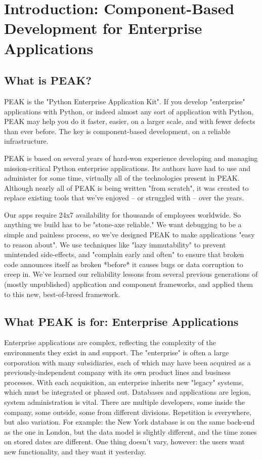 \chapter{Introduction: Component-Based Development for Enterprise Applications}

\section{What is PEAK?}

PEAK is the "Python Enterprise Application Kit". If you develop
"enterprise" applications with Python, or indeed almost any sort of
application with Python, PEAK may help you do it faster, easier, on a
larger scale, and with fewer defects than ever before. The key is
component-based development, on a reliable infrastructure. 

PEAK is based on several years of hard-won experience developing and
managing mission-critical Python enterprise applications. Its authors
have had to use and administer for some time, virtually all of the
technologies present in PEAK. Although nearly all of PEAK is being
written "from scratch", it was created to replace existing tools that
we've enjoyed -- or struggled with -- over the years. 

Our apps require 24x7 availability for thousands of employees worldwide.
So anything we build has to be "stone-axe reliable." We want debugging
to be a simple and painless process, so we've designed PEAK to make
applications "easy to reason about". We use techniques like "lazy
immutability" to prevent unintended side-effects, and "complain early
and often" to ensure that broken code announces itself as broken
*before* it causes bugs or data corruption to creep in. We've learned
our reliability lessons from several previous generations of (mostly
unpublished) application and component frameworks, and applied them to
this new, best-of-breed framework. 


\section{What PEAK is for: Enterprise Applications} 

Enterprise applications are complex, reflecting the complexity of the
environments they exist in and support. The "enterprise" is often a
large corporation with many subsidiaries, each of which may have been
acquired as a previously-independent company with its own product lines
and business processes. With each acquisition, an enterprise inherits
new "legacy" systems, which must be integrated or phased out. Databases
and applications are legion, system administration is vital. There are
multiple developers, some inside the company, some outside, some from
different divisions. Repetition is everywhere, but also variation. For
example: the New York database is on the same back-end as the one in
London, but the data model is slightly different, and the time zones on
stored dates are different. One thing doesn't vary, however: the users
want new functionality, and they want it yesterday. 

